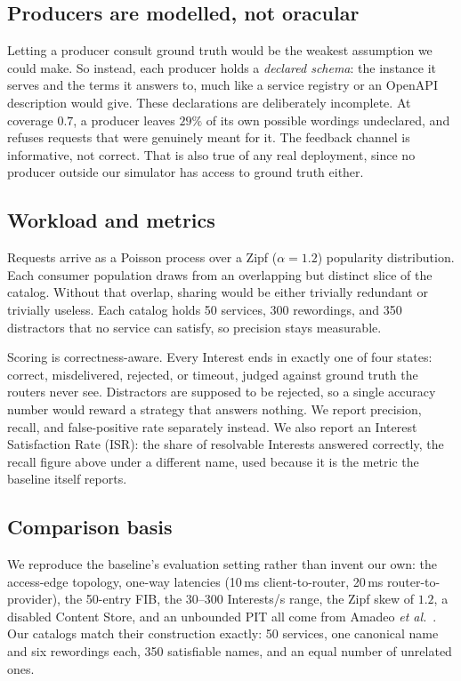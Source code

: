 \documentclass[conference]{IEEEtran}
\begin{document}
		\subsection{Producers are modelled, not oracular}
		
		Letting a producer consult ground truth would be the weakest assumption we
		could make. So instead, each producer holds a \emph{declared schema}: the
		instance it serves and the terms it answers to, much like a service
		registry or an OpenAPI description would give. These declarations are
		deliberately incomplete. At coverage $0.7$, a producer leaves $29\%$ of its
		own possible wordings undeclared, and refuses requests that were genuinely
		meant for it. The feedback channel is informative, not correct. That is
		also true of any real deployment, since no producer outside our simulator
		has access to ground truth either.
		
		\subsection{Workload and metrics}
		
		Requests arrive as a Poisson process over a Zipf ($\alpha=1.2$) popularity
		distribution. Each consumer population draws from an overlapping but
		distinct slice of the catalog. Without that overlap, sharing would be
		either trivially redundant or trivially useless. Each catalog holds 50
		services, 300 rewordings, and 350 distractors that no service can satisfy,
		so precision stays measurable.
		
		Scoring is correctness-aware. Every Interest ends in exactly one of four
		states: correct, misdelivered, rejected, or timeout, judged against ground
		truth the routers never see. Distractors are supposed to be rejected, so a
		single accuracy number would reward a strategy that answers nothing. We
		report precision, recall, and false-positive rate separately instead. We
		also report an Interest Satisfaction Rate (ISR): the share of resolvable
		Interests answered correctly, the recall figure above under a different
		name, used because it is the metric the baseline itself reports.
		
		\subsection{Comparison basis}
		\label{sec:basis}
		
		We reproduce the baseline's evaluation setting rather than invent our own:
		the access-edge topology, one-way latencies (10\,ms client-to-router,
		20\,ms router-to-provider), the 50-entry FIB, the 30--300 Interests/s
		range, the Zipf skew of $1.2$, a disabled Content Store, and an unbounded
		PIT all come from Amadeo \emph{et al.}~\cite{amadeo2026}. Our catalogs
		match their construction exactly: 50 services, one canonical name and six
		rewordings each, 350 satisfiable names, and an equal number of unrelated
		ones.
		
\end{document}
